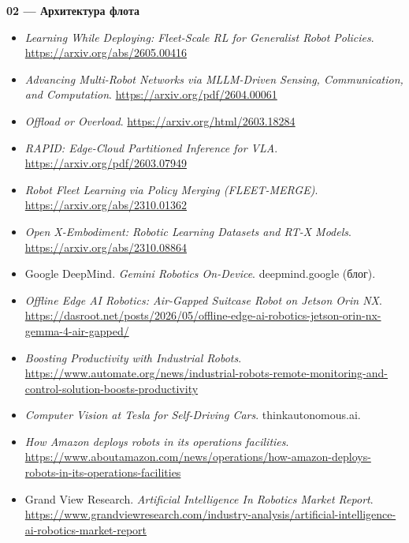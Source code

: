 \documentclass[11pt]{article}
\begin{document}
\textbf{02 --- Архитектура флота}
\begin{itemize}[leftmargin=1.3cm]
  \item \emph{Learning While Deploying: Fleet-Scale RL for Generalist Robot
        Policies}. \url{https://arxiv.org/abs/2605.00416}
  \item \emph{Advancing Multi-Robot Networks via MLLM-Driven Sensing,
        Communication, and Computation}. \url{https://arxiv.org/pdf/2604.00061}
  \item \emph{Offload or Overload}. \url{https://arxiv.org/html/2603.18284}
  \item \emph{RAPID: Edge-Cloud Partitioned Inference for VLA}.
        \url{https://arxiv.org/pdf/2603.07949}
  \item \emph{Robot Fleet Learning via Policy Merging (FLEET-MERGE)}.
        \url{https://arxiv.org/abs/2310.01362}
  \item \emph{Open X-Embodiment: Robotic Learning Datasets and RT-X Models}.
        \url{https://arxiv.org/abs/2310.08864}
  \item Google DeepMind. \emph{Gemini Robotics On-Device}. deepmind.google
        (блог).
  \item \emph{Offline Edge AI Robotics: Air-Gapped Suitcase Robot on Jetson
        Orin NX}.
        \url{https://dasroot.net/posts/2026/05/offline-edge-ai-robotics-jetson-orin-nx-gemma-4-air-gapped/}
  \item \emph{Boosting Productivity with Industrial Robots}.
        \url{https://www.automate.org/news/industrial-robots-remote-monitoring-and-control-solution-boosts-productivity}
  \item \emph{Computer Vision at Tesla for Self-Driving Cars}. thinkautonomous.ai.
  \item \emph{How Amazon deploys robots in its operations facilities}.
        \url{https://www.aboutamazon.com/news/operations/how-amazon-deploys-robots-in-its-operations-facilities}
  \item Grand View Research. \emph{Artificial Intelligence In Robotics Market
        Report}.
        \url{https://www.grandviewresearch.com/industry-analysis/artificial-intelligence-ai-robotics-market-report}
\end{itemize}
\end{document}
